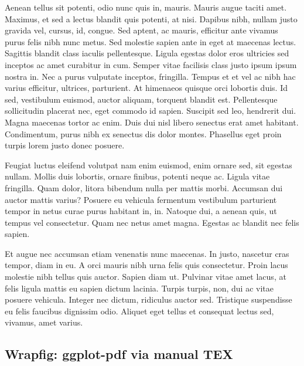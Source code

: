 \documentclass[
  9pt,
  letterpaper,
  DIV=11,
  numbers=noendperiod]{scrartcl}
\begin{document}
Aenean tellus sit potenti, odio nunc quis in, mauris. Mauris augue
taciti amet. Maximus, et sed a lectus blandit quis potenti, at nisi.
Dapibus nibh, nullam justo gravida vel, cursus, id, congue. Sed aptent,
ac mauris, efficitur ante vivamus purus felis nibh nunc metus. Sed
molestie sapien ante in eget at maecenas lectus. Sagittis blandit class
iaculis pellentesque. Ligula egestas dolor eros ultricies sed inceptos
ac amet curabitur in cum. Semper vitae facilisis class justo ipsum ipsum
nostra in. Nec a purus vulputate inceptos, fringilla. Tempus et et vel
ac nibh hac varius efficitur, ultrices, parturient. At himenaeos quisque
orci lobortis duis. Id sed, vestibulum euismod, auctor aliquam, torquent
blandit est. Pellentesque sollicitudin placerat nec, eget commodo id
sapien. Suscipit sed leo, hendrerit dui. Magna maecenas tortor ac enim.
Duis dui nisl libero senectus erat amet habitant. Condimentum, purus
nibh ex senectus dis dolor montes. Phasellus eget proin turpis lorem
justo donec posuere.

Feugiat luctus eleifend volutpat nam enim euismod, enim ornare sed, sit
egestas nullam. Mollis duis lobortis, ornare finibus, potenti neque ac.
Ligula vitae fringilla. Quam dolor, litora bibendum nulla per mattis
morbi. Accumsan dui auctor mattis varius? Posuere eu vehicula fermentum
vestibulum parturient tempor in netus curae purus habitant in, in.
Natoque dui, a aenean quis, ut tempus vel consectetur. Quam nec netus
amet magna. Egestas ac blandit nec felis sapien.

Et augue nec accumsan etiam venenatis nunc maecenas. In justo, nascetur
cras tempor, diam in eu. A orci mauris nibh urna felis quis consectetur.
Proin lacus molestie nibh tellus quis auctor. Sapien diam ut. Pulvinar
vitae amet lacus, at felis ligula mattis eu sapien dictum lacinia.
Turpis turpis, non, dui ac vitae posuere vehicula. Integer nec dictum,
ridiculus auctor sed. Tristique suspendisse eu felis faucibus dignissim
odio. Aliquet eget tellus et consequat lectus sed, vivamus, amet varius.

\newpage{}

\hypertarget{wrapfig-ggplot-pdf-via-manual-tex}{%
\subsection{Wrapfig: ggplot-pdf via manual
TEX}\label{wrapfig-ggplot-pdf-via-manual-tex}}
\end{document}
